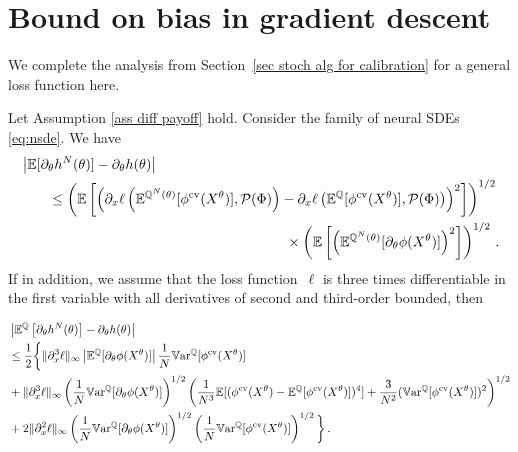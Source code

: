 \section{Bound on bias in gradient descent}
\label{sec grad des bias}

We complete the analysis from Section~\ref{sec stoch alg for calibration} for a general loss function here.
\begin{theorem}\label{th bias}
Let Assumption \ref{ass diff payoff} hold. Consider the family of neural SDEs \eqref{eq:nsde}. We have 
\begin{equation}\label{eq bias 1}
\begin{split}
&\left|\EE[\partial_{\theta}h^{N}(\theta) ] - \partial_{\theta}h(\theta)\right| \\
& \qquad \leq \left( \EE\left[ \left(\partial_x \ell\left(\EE^{\QQ^N(\theta)}[\phi^{\textup{cv}}(X^{\theta})],\Pp(\Phi) \right)- \partial_x \ell\left(\EE^{\QQ}[\phi^{\textup{cv}}(X^{\theta})],\Pp(\Phi) \right) \right)^2 \right] \right)^{1/2} \\
& \hskip0.55\textwidth \times \left( \EE \left[\left(\EE^{\QQ^N(\theta)}[\partial_\theta \phi(X^{\theta})]\right)^2\right] \right)^{1/2}\,.
 \end{split}
\end{equation}
If in addition, we assume that the loss function~$\ell$ is three times differentiable in the  first variable with all derivatives of second and third-order bounded, then
\begin{small}
\begin{equation}\label{eq bias 2}
\begin{split}
 	&\left| \mathbb{E}^{\mathbb{Q}}\left[\partial_{\theta} h^{N}(\theta)\right] -  \partial_{\theta}h(\theta) \right|\\ 
 	 & \leq \frac{1}{2}  \bigg\{ \| \partial_x^3 \ell\|_{\infty}  \left\lvert \mathbb{E}^{\mathbb{Q}}[\partial_\theta \phi(X^{\theta})]\right\rvert 
 \frac{1}{N}\mathbb{V}\mathrm{ar}^{\mathbb{Q}}[\phi^{\textup{cv}}(X^{\theta})] \\
 	 & + \| \partial_x^3 \ell\|_{\infty}
 	  \left( \frac{1}{N}\mathbb{V}\mathrm{ar}^{\mathbb{Q}}[\partial_\theta \phi(X^{\theta})]\right)^{1/2}
 	   \left( \frac{1}{N^3} \mathbb{E}[(\phi^{\textup{cv}}(X^{\theta}) - \mathbb{E}^{\mathbb{Q}}[\phi^{\textup{cv}}(X^{\theta})])^4]  +  \frac{3}{N^2} (\mathbb{V}\mathrm{ar}^{\mathbb{Q}}[\phi^{\textup{cv}}(X^{\theta})])^2\right)^{1/2} \\
 & + 2 \| \partial_x^2 \ell\|_{\infty}  \left( \frac{1}{N} \mathbb{V}\mathrm{ar}^{\mathbb{Q}}[\partial_{\theta}\phi(X^{\theta})]   \right)^{1/2}\left( \frac{1}{N} \mathbb{V}\mathrm{ar}^{\mathbb{Q}}[\phi^{\textup{cv}}(X^{\theta})] \right)^{1/2}\bigg\}\,.
 \end{split}
\end{equation}
\end{small}%
\end{theorem}
